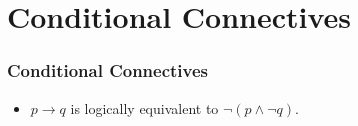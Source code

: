 \documentclass[Logic-MASTER.tex]{subfiles}
\begin{document}
\section{Conditional Connectives}
\begin{frame}

\frametitle{Conditional Connectives}
\Large
\begin{itemize}
\item $p \rightarrow q$ is logically equivalent to $\neg(p \wedge \neg q)$.
\end{itemize}
\end{frame}
\end{document}
